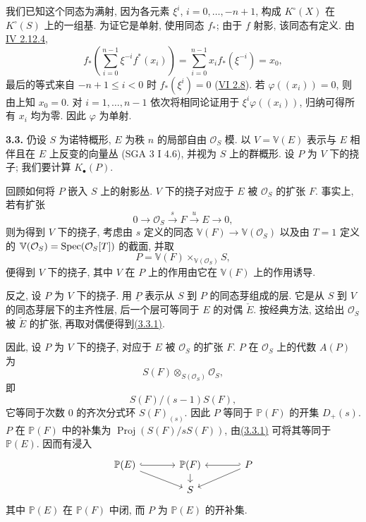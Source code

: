 我们已知这个同态为满射, 因为各元素 $\xi^i$, $i=0,\ldots,-n+1$, 构成 $K^\circ(X)$ 在 $K^\circ(S)$ 上的一组基. 为证它是单射, 使用同态 $f_*$; 由于 $f$ 射影, 该同态有定义. 由\hyperlink{sga6.e04.eq.2-12-4}{IV 2.12.4},
\[
 f_*\left(\sum_{i=0}^{n-1}\xi^{-i}f^*(x_i)\right)
 =\sum_{i=0}^{n-1}x_i f_*(\xi^{-i})=x_0,
\]
最后的等式来自 $-n+1\leq i<0$ 时 $f_*(\xi^i)=0$ (\hyperlink{sga6.e06.sec.2.8}{VI 2.8}). 若 $\varphi((x_i))=0$, 则由上知 $x_0=0$. 对 $i=1,\ldots,n-1$ 依次将相同论证用于 $\xi^i\varphi((x_i))$, 归纳可得所有 $x_i$ 均为零. 因此 $\varphi$ 为单射.

\textbf{3.3.} 仍设 $S$ 为诺特概形, $E$ 为秩 $n$ 的局部自由 $\mathcal O_S$ 模. 以 $V=\mathbb V(E)$ 表示与 $E$ 相伴且在 $E$ 上反变的向量丛 (SGA 3 I 4.6), 并视为 $S$ 上的群概形. 设 $P$ 为 $V$ 下的挠子; 我们要计算 $K_\bullet(P)$.

回顾如何将 $P$ 嵌入 $S$ 上的射影丛. $V$ 下的挠子对应于 $E$ 被 $\mathcal O_S$ 的扩张 $F$. 事实上, 若有扩张
\[
0\longrightarrow\mathcal O_S\xrightarrow{s}F\xrightarrow{u}E\longrightarrow 0,
\tag{3.3.1}
\]
则为得到 $V$ 下的挠子, 考虑由 $s$ 定义的同态 $\mathbb V(F)\to\mathbb V(\mathcal O_S)$ 以及由 $T=1$ 定义的 $\mathbb V(\mathcal O_S)=\operatorname{Spec}(\mathcal O_S[T])$ 的截面, 并取
\[
 P=\mathbb V(F)\times_{\mathbb V(\mathcal O_S)}S,
\]
便得到 $V$ 下的挠子, 其中 $V$ 在 $P$ 上的作用由它在 $\mathbb V(F)$ 上的作用诱导.

反之, 设 $P$ 为 $V$ 下的挠子. 用 $\underline P$ 表示从 $S$ 到 $P$ 的同态芽组成的层. 它是从 $S$ 到 $V$ 的同态芽层下的主齐性层, 后一个层可等同于 $E$ 的对偶 $\check E$. 按经典方法, 这给出 $\mathcal O_S$ 被 $\check E$ 的扩张, 再取对偶便得到\hyperlink{sga6.e09.eq.3-3-1}{(3.3.1)}.

因此, 设 $P$ 为 $V$ 下的挠子, 对应于 $E$ 被 $\mathcal O_S$ 的扩张 $F$. $P$ 在 $\mathcal O_S$ 上的代数 $A(P)$ 为
\[
 S(F)\otimes_{S(\mathcal O_S)}\mathcal O_S,
\]
即
\[
 S(F)/(s-1)S(F),
\]
它等同于次数 $0$ 的齐次分式环 $S(F)_{(s)}$. 因此 $P$ 等同于 $\mathbb P(F)$ 的开集 $D_+(s)$. $P$ 在 $\mathbb P(F)$ 中的补集为 $\operatorname{Proj}(S(F)/sS(F))$, 由\hyperlink{sga6.e09.eq.3-3-1}{(3.3.1)} 可将其等同于 $\mathbb P(E)$. 因而有浸入
\[
\begin{tikzcd}[column sep=large,row sep=small]
\mathbb P(E) \arrow[r,hook] \arrow[dr] & \mathbb P(F) \arrow[d] & P \arrow[l,hook'] \arrow[dl]\\
& S &
\end{tikzcd}
\]
其中 $\mathbb P(E)$ 在 $\mathbb P(F)$ 中闭, 而 $P$ 为 $\mathbb P(E)$ 的开补集.

